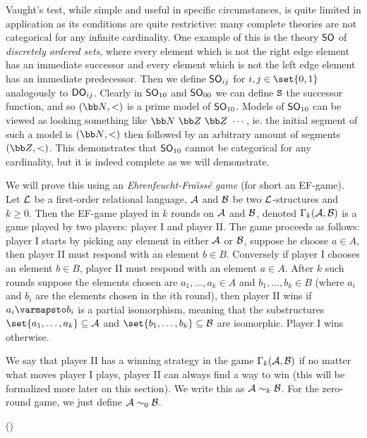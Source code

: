 Vaught's test, while simple and useful in specific circumstances, is quite limited in application as its conditions are quite restrictive: many complete theories are not categorical for any infinite
cardinality.
One example of this is the theory ${\sf SO}$ of {\it discretely ordered sets}, where every element which is not the right edge element has an immediate successor and every element which is not the
left edge element has an immediate predecessor.
Then we define ${\sf SO}_{ij}$ for $i,j\in\set{0,1}$ analogously to ${\sf DO}_{ij}$.
Clearly in ${\sf SO}_{10}$ and ${\sf SO}_{00}$ we can define ${\tt S}$ the successor function, and so $({\bb N},<)$ is a prime model of ${\sf SO}_{10}$.
Models of ${\sf SO}_{10}$ can be viewed as looking something like ${\bb N}\ {\bb Z}\ {\bb Z}\ \cdots$, ie. the initial segment of such a model is $({\bb N},<)$ then followed by an arbitrary amount of
segments $({\bb Z},<)$.
This demonstrates that ${\sf SO}_{10}$ cannot be categorical for any cardinality, but it is indeed complete as we will demonstrate.

We will prove this using an {\it Ehrenfeucht-Fra\"\i ss\'e game} (for short an EF-game).
Let ${\cal L}$ be a first-order relational language, ${\cal A}$ and ${\cal B}$ be two ${\cal L}$-structures and $k\geq0$.
Then the EF-game played in $k$ rounds on ${\cal A}$ and ${\cal B}$, denoted $\Gamma_k({\cal A},{\cal B})$ is a game played by two players: player I and player II.
The game proceeds as follows: player I starts by picking any element in either ${\cal A}$ or ${\cal B}$, suppose he choose $a\in A$, then player II must respond with an element $b\in B$.
Conversely if player I chooses an element $b\in B$, player II must respond with an element $a\in A$.
After $k$ such rounds suppose the elements chosen are $a_1,\dots,a_k\in A$ and $b_1,\dots,b_k\in B$ (where $a_i$ and $b_i$ are the elements chosen in the $i$th round), then player II wins if
$a_i\varmapsto b_i$ is a partial isomorphism, meaning that the substructures $\set{a_1,\dots,a_k}\subseteq{\cal A}$ and $\set{b_1,\dots,b_k}\subseteq{\cal B}$ are isomorphic.
Player I wins otherwise.

We say that player II has a winning strategy in the game $\Gamma_k({\cal A},{\cal B})$ if no matter what moves player I plays, player II can always find a way to win (this will be formalized more later on
this section).
We write this as ${\cal A}\sim_k{\cal B}$.
For the zero-round game, we just define ${\cal A}\sim_0{\cal B}$.

\bexam
    ({})

